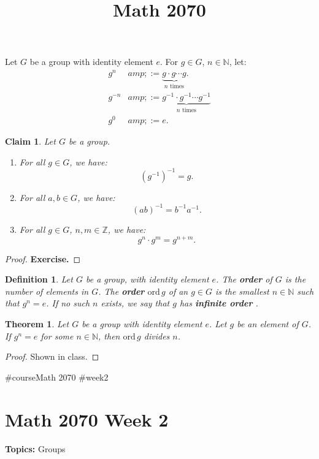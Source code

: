 \documentclass[a4paper,12pt]{report}
\newcommand{\ord}{\mathrm{ord}\,}
\renewcommand{\ord}{\mathrm{ord}\,}
\newcounter{statement}
\numberwithin{statement}{chapter}
\newtheorem{thm}[statement]{Theorem}
\newtheorem{defn}[statement]{Definition}
\newtheorem{claim}[statement]{Claim}
\numberwithin{equation}{chapter}
\numberwithin{section}{chapter}
\numberwithin{subsection}{section}
\begin{document}
Let $G$ be a group with identity element $e$.
For $g \in G$, $n \in \mathbb{N}$,
let:
\[\begin{split}
g^n &amp;:= \underbrace{g \cdot g \cdots g}_{n\text{ times}}.\\
g^{-n} &amp;:= \underbrace{g^{-1} \cdot g^{-1} \cdots g^{-1}}_{n\text{ times}}\\
g^0 &amp;:= e.
\end{split}\]
\begin{claim}

Let $G$ be a group.
\begin{enumerate}
\item 
For all $g \in G$,
we have:
\[(g^{-1})^{-1} = g.\]
  
\item 
For all $a, b \in G$,
we have:
\[(ab)^{-1} = b^{-1}a^{-1}.\]
  
\item 
For all $g \in G$, $n, m \in \mathbb{Z}$, we have:
\[g^n\cdot g^m = g^{n + m}.\]
  \end{enumerate}
\end{claim}
\begin{proof}

 {\bf Exercise.} 
\end{proof}

\begin{defn}
Let $G$ be a group, with identity element $e$.
The  {\bf order}  of $G$ is the number of elements in $G$.
The  {\bf order}  $\ord g$ of an  $g \in G$
is the smallest $n \in \mathbb{N}$ such that $g^n = e$.
If no such $n$ exists, we say that $g$ has  {\bf infinite order} .
\end{defn}
\begin{thm}

Let $G$ be a group with identity element $e$.
Let $g$ be an element of $G$. If $g^n = e$ for some $n \in \mathbb{N}$,
then $\ord g$ divides $n$.
\end{thm}
\begin{proof}

Shown in class.
\end{proof}
#course{Math 2070}
#week{2}
\title{Math 2070}
\setcounter{chapter}{2}\setcounter{section}{0}
\setcounter{subsection}{0}


\chapter*{Math 2070 Week 2}
{\bf Topics: }Groups
\end{document}
